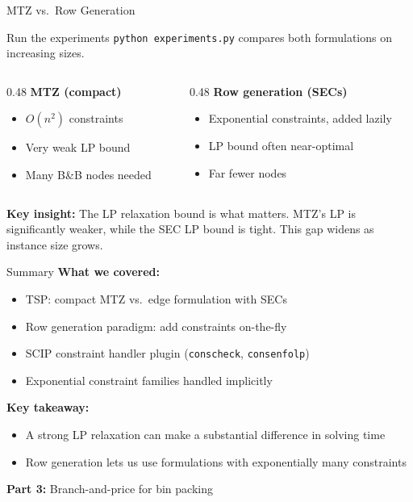 \documentclass[aspectratio=169]{beamer}
\begin{document}
\begin{frame}{MTZ vs.\ Row Generation}
\begin{block}{Run the experiments}
\texttt{python experiments.py} compares both formulations on increasing sizes.
\end{block}

\medskip
\begin{columns}[T]
\begin{column}{0.48\textwidth}
\textbf{MTZ (compact)}
\begin{itemize}
  \item $O(n^2)$ constraints
  \item Very weak LP bound
  \item Many B\&B nodes needed
\end{itemize}
\end{column}
\begin{column}{0.48\textwidth}
\textbf{Row generation (SECs)}
\begin{itemize}
  \item Exponential constraints, added lazily
  \item LP bound often near-optimal
  \item Far fewer nodes
\end{itemize}
\end{column}
\end{columns}

\bigskip
\textbf{Key insight:} The LP relaxation bound is what matters. MTZ's LP
is significantly weaker, while the SEC LP bound is tight.
This gap widens as instance size grows.
\end{frame}

\begin{frame}{Summary}
\textbf{What we covered:}
\begin{itemize}
  \item TSP: compact MTZ vs.\ edge formulation with SECs
  \item Row generation paradigm: add constraints on-the-fly
  \item SCIP constraint handler plugin (\texttt{conscheck}, \texttt{consenfolp})
  \item Exponential constraint families handled implicitly
\end{itemize}

\medskip
\textbf{Key takeaway:}
\begin{itemize}
  \item A strong LP relaxation can make a substantial difference in solving time
  \item Row generation lets us use formulations with exponentially many constraints
\end{itemize}

\medskip
\textbf{Part 3:} Branch-and-price for bin packing
\end{frame}
\end{document}
